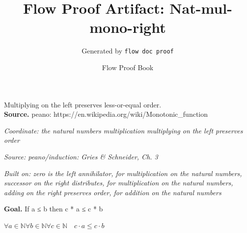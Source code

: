 \documentclass[11pt]{article}
\title{Flow Proof Artifact: Nat-mul-mono-right}
\author{Generated by \texttt{flow doc proof}}
\date{Flow Proof Book}
\theoremstyle{definition}
\begin{document}
\maketitle
Multiplying on the left preserves less-or-equal order.\\[0.5em]
\textbf{Source.} peano: https://en.wikipedia.org/wiki/Monotonic\_function\\[0.5em]
\bigskip
{}\par
\smallskip\noindent\textit{Coordinate: the natural numbers \cdot multiplication \cdot multiplying on the left preserves order}\par
\smallskip\noindent\textit{Source: peano/induction: Gries \& Schneider, Ch. 3}\par
\smallskip\noindent\textit{Built on: zero is the left annihilator, for multiplication on the natural numbers, successor on the right distributes, for multiplication on the natural numbers, adding on the right preserves order, for addition on the natural numbers}\par
\medskip
\noindent\textbf{Goal.} If a ≤ b then c * a ≤ c * b\par
\noindent$\displaystyle \forall a \in \mathbb{N} \forall b \in \mathbb{N} \forall c \in \mathbb{N}\quad c \cdot a \le c \cdot b$\par
\medskip
\noindent
\end{document}
